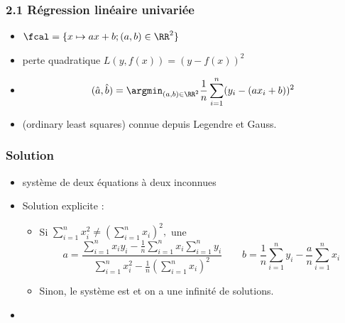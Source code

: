 \begin{frame}
  \frametitle{2.1 Régression linéaire univariée}
  \begin{itemize}
  \item {}  $\fcal = \{x \mapsto a x + b ; (a, b) \in \RR^2\}$ 
    \pause
  \item {} perte quadratique $L(y, f(x)) = (y - f(x))^2$
    \pause
  \item {}
    \[ (\hat{a}, \hat{b}) = \argmin_{(a,b) \in \RR^2} \frac1n \sum_{i=1}^n (y_i - (a x_i + b))^2 \]
    \pause
  \item[]  \textcolor{gray!70}{(ordinary least squares)} connue depuis Legendre et Gauss. 
  \end{itemize}
\end{frame}

\begin{frame}
  \frametitle{Solution}
  \begin{itemize}
  \item {} système de deux équations à deux inconnues
  \item[] Solution explicite : 
    \begin{itemize}
    \item Si $\sum_{i=1}^n x_i^2 \neq \left(\sum_{i=1}^n x_i\right)^2,$ une 
      \[ a = \frac{\sum_{i=1}^n x_i y_i - \frac1n \sum_{i=1}^n x_i \sum_{i=1}^n y_i}{
          \sum_{i=1}^n x_i^2 - \frac1n \left(\sum_{i=1}^n x_i\right)^2}  \hspace{2em}
        b = \frac1n \sum_{i=1}^n y_i - \frac{a}{n} \sum_{i=1}^n x_i\]
      \pause
    \item Sinon, le système est  et on a une infinité de solutions.
    \end{itemize}
  \pause
  \item {}
  \end{itemize}
\end{frame}

